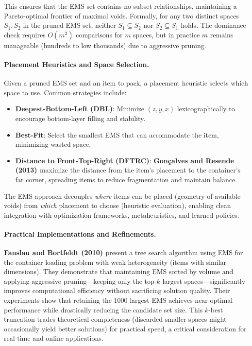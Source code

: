 This ensures that the EMS set contains no subset relationships, maintaining a Pareto-optimal frontier of maximal voids. Formally, for any two distinct spaces $S_1, S_2$ in the pruned EMS set, neither $S_1 \subseteq S_2$ nor $S_2 \subseteq S_1$ holds. The dominance check requires $O(m^2)$ comparisons for $m$ spaces, but in practice $m$ remains manageable (hundreds to low thousands) due to aggressive pruning.

\paragraph{Placement Heuristics and Space Selection.}
Given a pruned EMS set and an item to pack, a placement heuristic selects which space to use. Common strategies include:
\begin{itemize}
\item \textbf{Deepest-Bottom-Left (DBL)}: Minimize $(z, y, x)$ lexicographically to encourage bottom-layer filling and stability.
\item \textbf{Best-Fit}: Select the smallest EMS that can accommodate the item, minimizing wasted space.
\item \textbf{Distance to Front-Top-Right (DFTRC)}: \textbf{Gonçalves and Resende (2013) \cite{GR13}} maximize the distance from the item's placement to the container's far corner, spreading items to reduce fragmentation and maintain balance.
\end{itemize}

The EMS approach decouples \textit{where} items can be placed (geometry of available voids) from \textit{which} placement to choose (heuristic evaluation), enabling clean integration with optimization frameworks, metaheuristics, and learned policies.

\paragraph{Practical Implementations and Refinements.}
\textbf{Fanslau and Bortfeldt (2010) \cite{FB10}} present a tree search algorithm using EMS for the container loading problem with weak heterogeneity (items with similar dimensions). They demonstrate that maintaining EMS sorted by volume and applying aggressive pruning---keeping only the top-$k$ largest spaces---significantly improves computational efficiency without sacrificing solution quality. Their experiments show that retaining the 1000 largest EMS achieves near-optimal performance while drastically reducing the candidate set size. This $k$-best truncation trades theoretical completeness (discarded smaller spaces might occasionally yield better solutions) for practical speed, a critical consideration for real-time and online applications.

